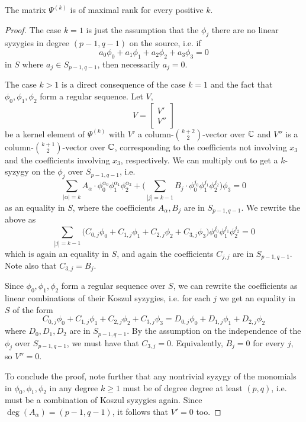 \documentclass[fleqn,reqno]{amsart}
\numberwithin{first}{chapter}
\numberwithin{section}{chapter}
\numberwithin{equation}{first}
\begin{document}
\begin{lemma}
	\label{lemma:Psi-nonsing}
	The matrix $\Psi^{(k)}$ is of maximal rank for every positive $k$.
\end{lemma}

\begin{proof}
	The case $k=1$ is just the assumption that the $\phi_j$ there are no linear syzygies
	in degree $(p-1,q-1)$ on the source,
	i.e. if
	\[
		a_0\phi_0+a_1\phi_1+a_2\phi_2+a_3\phi_3=0
	\]
	in $S$ where $a_j\in S_{p-1,q-1}$, then necessarily $a_j=0$.
	
	The case $k>1$ is a direct consequence of the case $k=1$ and the fact that
	$\phi_0,\phi_1,\phi_2$ form a regular sequence. Let $V$,
	\[
		V=\begin{bmatrix}{V'}\\{V''}\end{bmatrix}
	\]
	be a kernel element of $\Psi^{(k)}$ with $V'$ a column-$\binom{k+2}{2}$-vector over $\mathbb{C}$
	and $V''$ is a column-$\binom{k+1}{2}$-vector over $\mathbb{C}$, corresponding to the coefficients
	not involving $x_3$ and the coefficients involving $x_3$, respectively.
	We can multiply out to get a $k$-syzygy on the $\phi_j$ over $S_{p-1,q-1}$, i.e.
	\[
		\sum_{|\alpha|=k} A_\alpha\cdot
		\phi_0^{\alpha_0}\phi_1^{\alpha_1}\phi_2^{\alpha_2}+
		\big(\sum_{|j|=k-1} B_{j}\cdot
		\phi_0^{j_0}\phi_1^{j_1}\phi_2^{j_2}\big)\phi_3=0
	\]
	as an equality in $S$, where the coefficients $A_\alpha, B_j$ are in $S_{p-1,q-1}$.
	We rewrite the above as
	\[
		\sum_{|j|=k-1}\big(
		C_{0,j}\phi_0+C_{1,j}\phi_1+C_{2,j}\phi_2+C_{3,j}\phi_3\big)
		\phi_0^{j_0}\phi_1^{j_1}\phi_2^{j_2}=0
	\]
	which is again an equality in $S$, and again the coefficients $C_{j,j}$ are in $S_{p-1,q-1}$.
	Note also that $C_{3,j}=B_j$.
	
	Since $\phi_0,\phi_1,\phi_2$ form a regular sequence over $S$,
	we can rewrite the coefficients as linear combinations of their Koszul syzygies,
	i.e. for each $j$ we get an equality in $S$ of the form
	\[
		C_{0,j}\phi_0+C_{1,j}\phi_1+C_{2,j}\phi_2+C_{3,j}\phi_3=
		D_{0,j}\phi_0+D_{1,j}\phi_1+D_{2,j}\phi_2
	\]
	where $D_0,D_1,D_2$ are in $S_{p-1,q-1}$.
	By the assumption on the independence of the $\phi_j$ over $S_{p-1,q-1}$,
	we must have that $C_{3,j}=0$.
	Equivalently, $B_j=0$ for every $j$, so $V''=0$.
	
	To conclude the proof, note further that any nontrivial syzygy
	of the monomials in $\phi_0,\phi_1,\phi_2$
	in any degree $k\geq1$ must be of degree degree at least $(p,q)$,
	i.e. must be a combination of Koszul syzygies again.
	Since $\deg(A_\alpha)=(p-1,q-1)$, it follows that $V'=0$ too.
\end{proof}
\end{document}
